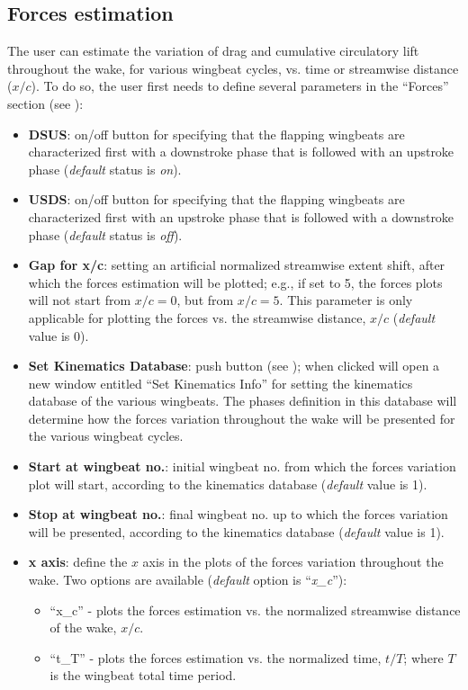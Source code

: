 \documentclass[12pt,a4paper]{article}
\begin{document}
\subsection{Forces estimation}\label{forces_estimation}
The user can estimate the variation of drag and cumulative circulatory lift throughout the wake, for various wingbeat cycles, vs. time or streamwise distance ($x/c$). 
To do so, the user first needs to define several parameters in the ``Forces'' section (see ):
\begin{itemize}
	\item \textbf{DSUS}: on/off button for specifying that the flapping wingbeats are characterized first with a downstroke phase that is followed with an upstroke phase (\textit{default} status is \textit{on}).
	\item \textbf{USDS}: on/off button for specifying that the flapping wingbeats are characterized first with an upstroke phase that is followed with a downstroke phase (\textit{default} status is \textit{off}).
	\item \textbf{Gap for x/c}: setting an artificial normalized streamwise extent shift, after which the forces estimation will be plotted; e.g., if set to 5, the forces plots will not start from $x/c=0$, but from $x/c=5$. This parameter is only applicable for plotting the forces vs. the streamwise distance, $x/c$ (\textit{default} value is 0).
	\item \textbf{Set Kinematics Database}: push button (see ); when clicked will open a new window entitled ``Set Kinematics Info'' for setting the kinematics database of the various wingbeats. The phases definition in this database will determine how the forces variation throughout the wake will be presented for the various wingbeat cycles.
	\item \textbf{Start at wingbeat no.}: initial wingbeat no. from which the forces variation plot will start, according to the kinematics database (\textit{default} value is 1).
	\item \textbf{Stop at wingbeat no.}: final wingbeat no. up to which the forces variation will be presented, according to the kinematics database (\textit{default} value is 1).
	\item \textbf{x axis}: define the $x$ axis in the plots of the forces variation throughout the wake. Two options are available (\textit{default} option is ``\textit{x\_c}''):
	\begin{itemize}
		\item ``x\_c'' - plots the forces estimation vs. the normalized streamwise distance of the wake, $x/c$.
		\item ``t\_T'' - plots the forces estimation vs. the normalized time, $t/T$; where $T$ is the wingbeat total time period.
	\end{itemize}
\end{itemize}
\end{document}
